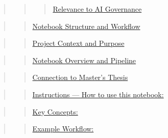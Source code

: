 \documentclass[
  11pt,
  letterpaper,
]{book}
\begin{document}
\begin{quote}
\begin{quote}
\begin{quote}
\hyperref[scrollTo=iDy_leH6DJH_]{Relevance to AI Governance}
\end{quote}
\end{quote}
\end{quote}

\begin{quote}
\begin{quote}
\hyperref[scrollTo=iDy_leH6DJH_]{Notebook Structure and Workflow}
\end{quote}
\end{quote}

\begin{quote}
\begin{quote}
\hyperref[scrollTo=Cm1JQGDYNJjf]{Project Context and Purpose}
\end{quote}
\end{quote}

\begin{quote}
\begin{quote}
\hyperref[scrollTo=Cm1JQGDYNJjf]{Notebook Overview and Pipeline}
\end{quote}
\end{quote}

\begin{quote}
\begin{quote}
\hyperref[scrollTo=Cm1JQGDYNJjf]{Connection to Master's Thesis}
\end{quote}
\end{quote}

\begin{quote}
\begin{quote}
\hyperref[scrollTo=22NBzTxxsnfQ]{Instructions --- How to use this
notebook:}
\end{quote}
\end{quote}

\begin{quote}
\begin{quote}
\hyperref[scrollTo=NovjnOw6bzLi]{Key Concepts:}
\end{quote}
\end{quote}

\begin{quote}
\begin{quote}
\hyperref[scrollTo=NovjnOw6bzLi]{Example Workflow:}
\end{quote}
\end{quote}
\end{document}
